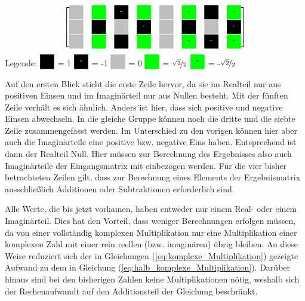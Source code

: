 \begin{minipage}{0.9\textwidth}
\begin{center}
\[{\begin{bmatrix}
     \myboxZero 	& \myboxSqrtPos 	& \myboxOneNeg 	& \myboxSqrtPos		& \myboxZero 	& \myboxSqrtNeg 	& \myboxOnePos 	& \myboxSqrtNeg \\
     \myboxZero 	& \myboxOnePos 		& \myboxZero 	& \myboxOneNeg 		& \myboxZero 	& \myboxOnePos 		& \myboxZero 	& \myboxOneNeg \\
     \myboxZero 	& \myboxSqrtPos 	& \myboxOnePos 	& \myboxSqrtPos		& \myboxZero	& \myboxSqrtNeg		& \myboxOneNeg	& \myboxSqrtNeg 
    \end{bmatrix}
   }
  \]
\vspace{0.5cm}
  Legende: $\myboxOnePos$ = 1 \quad $\myboxOneNeg$ = -1 \quad $\myboxZero$ = 0 \quad $\myboxSqrtPos$ = $\nicefrac{\sqrt{2}}{2}$ \quad $\myboxSqrtNeg$ = -$\nicefrac{\sqrt{2}}{2}$
  \label{pic:MatrizenDarstellungTwiddlefaktoren}
\end{center}
\endgroup
\end{minipage}


\vspace{0.5cm}
 
 Auf den ersten Blick sticht die erste Zeile hervor, da sie im Realteil nur aus positiven Einsen und im Imaginärteil nur aus Nullen besteht.
 Mit der fünften Zeile verhält es sich ähnlich. Anders ist hier, dass sich positive und negative Einsen abwechseln.
 In die gleiche Gruppe können noch die dritte und die siebte Zeile zusammengefasst werden. 
 Im Unterschied zu den vorigen können hier aber auch die Imaginärteile eine positive bzw. negative Eins haben. Entsprechend ist dann der Realteil
 Null. Hier müssen zur Berechnung des Ergebnisses also auch Imaginärteile der Eingangsmatrix mit einbezogen werden.
 Für die vier bisher betrachteten Zeilen gilt, dass zur Berechnung eines Elements der Ergebnismatrix ausschließlich Additionen oder Subtraktionen erforderlich sind. 
 
 
 Alle Werte, die bis jetzt vorkamen, haben entweder nur einem Real- oder einem Imaginärteil. 
 Dies hat den Vorteil, dass weniger Berechnungen erfolgen müssen, da von einer vollständig komplexen Multiplikation nur eine Multiplikation einer komplexen Zahl mit einer
 rein reellen (bzw. imaginären) übrig bleiben. Au diese Weise reduziert sich der in Gleichungen (\ref{eq:komplexe_Multiplikation}) gezeigte Aufwand zu dem in Gleichung (\ref{eq:halb_komplexe_Multiplikation}).
 Darüber hinaus sind bei den bisherigen Zahlen keine Multiplikationen nötig, weshalb sich der Rechenaufwandt auf den Additionsteil der Gleichung beschränkt.
 
